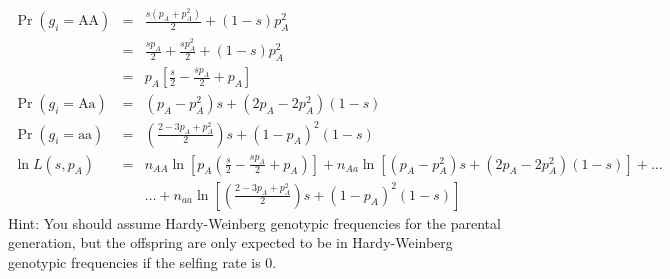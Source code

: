 \documentclass[11pt]{article}
\begin{document}
{\begin{eqnarray*}
	\Pr(g_i = \mbox{AA}) & = & \frac{s(p_A +p_A^2)}{2} + (1-s)p_A^2\\
	 & = & \frac{s p_A}{2} + \frac{sp_A^2}{2} + (1-s)p_A^2\\
	  & = & p_A\left[\frac{s}{2} - \frac{sp_A}{2} + p_A\right]\\
\Pr(g_i=\mbox{Aa}) & = & (p_A - p_A^2)s + (2p_A - 2p_A^2)(1-s) \\
\Pr(g_i=\mbox{aa}) & = & \left(\frac{2 - 3p_A + p_A^2}{2}\right)s + (1-p_A)^2(1-s) \\
\ln L (s, p_A) & = &  n_{AA}\ln\left[p_A\left(\frac{s}{2} - \frac{sp_A}{2} + p_A\right)\right] + n_{Aa}\ln\left[(p_A - p_A^2)s + (2p_A - 2p_A^2)(1-s)\right] + \ldots \\
 & & \ldots + n_{aa}\ln\left[\left(\frac{2 - 3p_A + p_A^2}{2}\right)s + (1-p_A)^2(1-s)\right]
\end{eqnarray*}
}
Hint: You should assume Hardy-Weinberg genotypic frequencies for the parental generation, but the offspring are only expected to be in Hardy-Weinberg genotypic frequencies if the selfing rate is 0.
\end{document}
